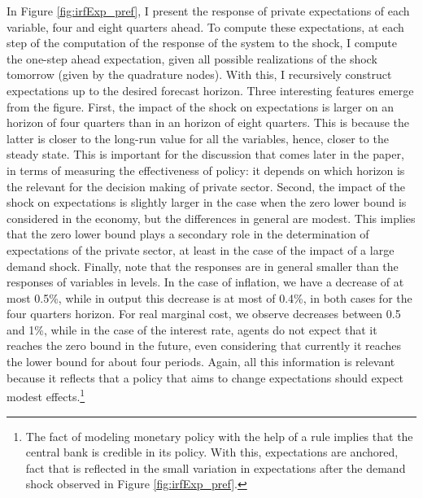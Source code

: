 \documentclass[12pt]{article}
\numberwithin{equation}{section}
\begin{document}
In Figure \ref{fig:irfExp_pref}, I present the response of private expectations of each variable, four and eight quarters ahead. To compute these expectations, at each step of the computation of the response of the system to the shock, I compute the one-step ahead expectation, given all possible realizations of the shock tomorrow (given by the quadrature nodes). With this, I recursively construct expectations up to the desired forecast horizon. Three interesting features emerge from the figure. First, the impact of the shock on expectations is larger on an horizon of four quarters than in an horizon of eight quarters. This is because the latter is closer to the long-run value for all the variables, hence, closer to the steady state. This is important for the discussion that comes later in the paper, in terms of measuring the effectiveness of policy: it depends on which horizon is the relevant for the decision making of private sector. Second, the impact of the shock on expectations is slightly larger in the case when the zero lower bound is considered in the economy, but the differences in general are modest. This implies that the zero lower bound plays a secondary role in the determination of expectations of the private sector, at least in the case of the impact of a large demand shock. Finally, note that the responses are in general smaller than the responses of variables in levels. In the case of inflation, we have a decrease of at most 0.5\%, while in output this decrease is at most of 0.4\%, in both cases for the four quarters horizon. For real marginal cost, we observe decreases between 0.5 and 1\%, while in the case of the interest rate, agents do not expect that it reaches the zero bound in the future, even considering that currently it reaches the lower bound for about four periods. Again, all this information is relevant because it reflects that a policy that aims to change expectations should expect modest effects.\footnote{The fact of modeling monetary policy with the help of a rule implies that the central bank is credible in its policy. With this, expectations are anchored, fact that is reflected in the small variation in expectations after the demand shock observed in Figure \ref{fig:irfExp_pref}.}

\end{document}
